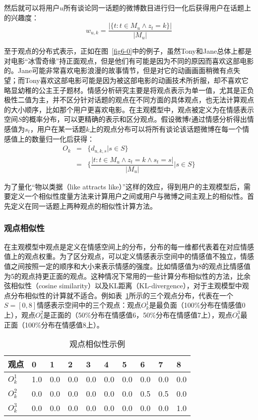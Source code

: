 然后就可以将用户$ u $所有谈论同一话题的微博数目进行归一化后获得用户在话题上的兴趣度：
\begin{equation}
w_{u,k}=\dfrac{|\{ t: t \in M_{u} \wedge z_{t}=k\}|}{|M_{u}|}
\end{equation}

至于观点的分布式表示，正如在图~\ref{fig6-0}中的例子，虽然Tony和Jane总体上都是对电影“冰雪奇缘”持正面观点，但是他们有可能是因为不同的原因而喜欢这部电影的。Jane可能非常喜欢电影浪漫的故事情节，但是对它的动画画面稍微有点失望；而Tony喜欢这部电影可能是因为被这部电影的动画技术所折服，却不喜欢它略显幼稚的公主王子题材。情感分析研究主要是将观点表示为单一值，尤其是正负极性二值为主，并不区分针对话题的观点在不同方面的具体观点，也无法计算观点的大小顺序，比如那个用户更喜欢电影。在主观模型中，观点被定义为在情感表示空间$ S $的概率分布，可以更精确的表示和区分观点。假设微博$ t $通过情感分析得出情感值为$ s_t $，用户在某一话题$ k $上的观点分布可以将所有谈论该话题微博在每一个情感值上的数量归一化后获得：
\begin{eqnarray}
O_k &= & \{ d_{u,k,s}|s \in S \} \nonumber \\
  &=& \{ \dfrac{|t:t \in M_u \wedge z_t=k \wedge s_t=s|}{|M_u|}|s \in S\}
\end{eqnarray}

为了量化“物以类据（like attracts like）”这样的效应，得到用户的主观模型后，需要定义一个相似性度量方法来计算用户之间或用户与微博之间主观上的相似性。首先定义在同一话题上两种观点的相似性计算方法。
 
\subsubsection{观点相似性}
\label{opsim}

在主观模型中观点是定义在情感空间上的分布，分布的每一维都代表着在对应情感值上的观点权重。为了区分观点，可以定义情感表示空间中的情感值不独立，情感值之间按照一定的顺序和大小来表示情感的强度。比如情感值为8的观点比情感值为5的观点持更正面的观点。这种情况下常用的一些计算分布相似性的方法，比余弦相似性（cosine similarity）以及KL距离（KL-divergence），对于主观模型中观点分布相似性的计算就不适合。例如表~\ref{tab6-1}所示的三个观点分布，代表在一个$ S=[0,8 ] $情感表示空间中的三个观点：观点$ O_{k}^{1} $是最负面（100\%分布在情感值0上），观点$ O_{k}^{2} $是正面的（50\%分布在情感值6，50\%分布在情感值7上），观点$ O_{k}^{3} $最正面（100\%分布在情感值8上）。
\begin{table}[htb]
\centering
\caption{观点相似性示例}
\label{tab6-1}
\begin{tabular}{|l|l|l|l|l|l|l|l|l|l|}
\hline
 观点& 0 & 1& 2 & 3 & 4 & 5 & 6 & 7 & 8 \\
\hline
$O_{k}^{1}$ & 1.0 & 0.0 & 0.0 & 0.0 & 0.0 & 0.0 & 0.0 & 0.0 & 0.0 \\
\hline
$O_{k}^{2}$ & 0.0 & 0.0 & 0.0 & 0.0 & 0.0 & 0.0 & 0.5 & 0.5 & 0.0 \\
\hline
$O_{k}^{3}$ & 0.0 & 0.0 & 0.0 & 0.0 & 0.0 & 0.0 & 0.0 & 0.0 & 1.0 \\
\hline
\end{tabular}
\end{table} 

